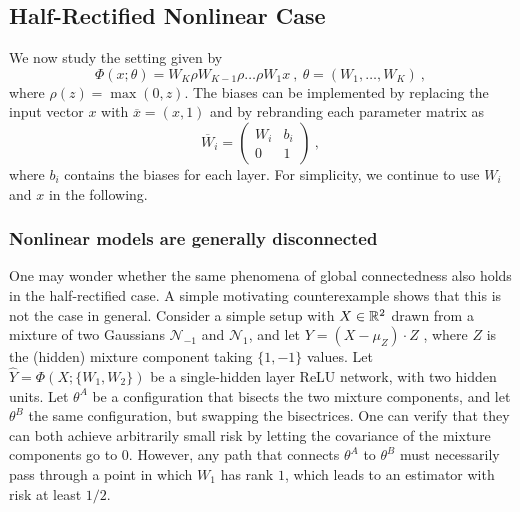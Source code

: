 \subsection{Half-Rectified Nonlinear Case}

We now study the setting given by 
\begin{equation}
\label{relucase}
\Phi(x;\theta) = W_K \rho W_{K-1} \rho \dots \rho W_1 x~,~\theta = (W_1, \dots, W_K)~,
\end{equation}
where $\rho(z) = \max(0 ,z)$. 
The biases can be implemented by replacing the input vector $x$ 
with $\overline{x}=(x, 1)$ and by rebranding each parameter matrix as 
$$\overline{W}_i = \left( 
\begin{array}{c|c}
W_i & b_i \\
\hline 
0 & 1 
\end{array}
\right)~,$$
where $b_i$ contains the biases for each layer.	
For simplicity, we continue to use $W_i$ and $x$ in the following.

\subsubsection{Nonlinear models are generally disconnected}
\label{disconnect}

One may wonder whether the same phenomena of global connectedness also holds 
in the half-rectified case. A simple motivating counterexample shows that this is not the case in 
general. Consider a simple setup with $X \in {\mathbb{R}}^2$ drawn from a mixture of two Gaussians $\mathcal{N}_{-1}$ 
and $\mathcal{N}_{1}$, and let $Y = (X-\mu_Z) \cdot Z $ , where $Z$ is the (hidden) mixture component taking $\{1,-1\}$ values.  Let 
$\hat{Y} = \Phi(X; \{ W_1, W_2\} )$ be a single-hidden layer ReLU network, with two hidden units. 
Let $\theta^A$ be a configuration that bisects the two mixture components, 
and let $\theta^B$ the same configuration, but swapping the bisectrices. 
One can verify that they can both achieve arbitrarily small risk by letting the covariance of the mixture components go to $0$. 
However, any path that connects $\theta^A$ to $\theta^B$ 
must necessarily pass through a point in which $W_1$ has rank $1$, which leads to an estimator with risk at least $1/2$.  


